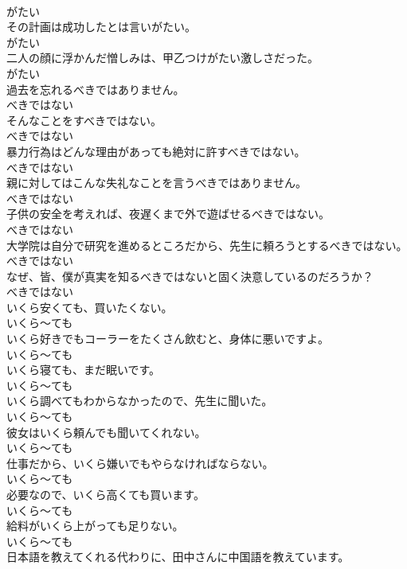 \documentclass[8pt]{extreport}
\begin{document}
\begin{CJK}{UTF8}{min}
\\	がたい
\\	その計画は成功したとは言いがたい。	
\\	がたい
\\	二人の顔に浮かんだ憎しみは、甲乙つけがたい激しさだった。	
\\	がたい
\\	過去を忘れるべきではありません。	
\\	べきではない
\\	そんなことをすべきではない。	
\\	べきではない
\\	暴力行為はどんな理由があっても絶対に許すべきではない。	
\\	べきではない
\\	親に対してはこんな失礼なことを言うべきではありません。	
\\	べきではない
\\	子供の安全を考えれば、夜遅くまで外で遊ばせるべきではない。	
\\	べきではない
\\	大学院は自分で研究を進めるところだから、先生に頼ろうとするべきではない。	
\\	べきではない
\\	なぜ、皆、僕が真実を知るべきではないと固く決意しているのだろうか？	
\\	べきではない
\\	いくら安くても、買いたくない。	
\\	いくら～ても
\\	いくら好きでもコーラーをたくさん飲むと、身体に悪いですよ。	
\\	いくら～ても
\\	いくら寝ても、まだ眠いです。	
\\	いくら～ても
\\	いくら調べてもわからなかったので、先生に聞いた。	
\\	いくら～ても
\\	彼女はいくら頼んでも聞いてくれない。	
\\	いくら～ても
\\	仕事だから、いくら嫌いでもやらなければならない。	
\\	いくら～ても
\\	必要なので、いくら高くても買います。	
\\	いくら～ても
\\	給料がいくら上がっても足りない。	
\\	いくら～ても
\\	日本語を教えてくれる代わりに、田中さんに中国語を教えています。	

\end{CJK}
\end{document}
